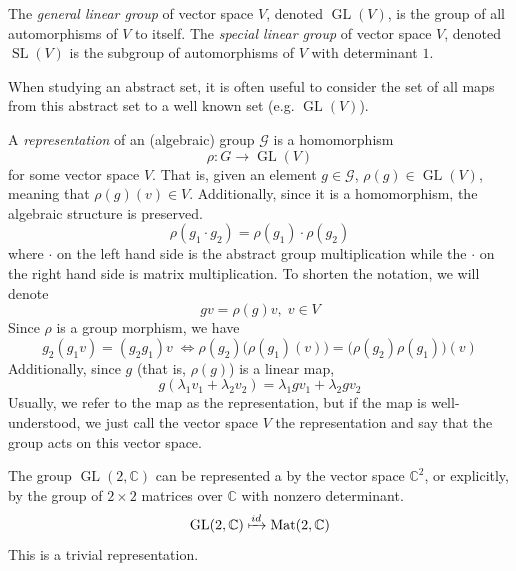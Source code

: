 \documentclass{article}
\DeclareMathOperator{\GL}{GL}
\DeclareMathOperator{\SL}{SL}
\begin{document}
  \begin{definition}
    The \textit{general linear group} of vector space $V$, denoted $\GL(V)$, is the group of all automorphisms of $V$ to itself. The \textit{special linear group} of vector space $V$, denoted $\SL(V)$ is the subgroup of automorphisms of $V$ with determinant $1$. 
  \end{definition}

  When studying an abstract set, it is often useful to consider the set of all maps from this abstract set to a well known set (e.g. $\GL(V)$). 

  \begin{definition}
    A \textit{representation} of an (algebraic) group $\mathcal{G}$ is a homomorphism 
    \begin{equation}
      \rho: G \longrightarrow \GL(V)
    \end{equation}
    for some vector space $V$. That is, given an element $g \in \mathcal{G}$, $\rho(g) \in \GL (V)$, meaning that $\rho(g)(v) \in V$. Additionally, since it is a homomorphism, the algebraic structure is preserved. 
    \begin{equation}
      \rho(g_1 \cdot g_2) = \rho(g_1) \cdot \rho(g_2)
    \end{equation}
    where $\cdot$ on the left hand side is the abstract group multiplication while the $\cdot$ on the right hand side is matrix multiplication. To shorten the notation, we will denote 
    \begin{equation}
      g v = \rho(g) v, \; v \in V
    \end{equation}
    Since $\rho$ is a group morphism, we have 
    \begin{equation}
      g_2 (g_1 v) = (g_2 g_1) v \; \iff \rho(g_2) \big( \rho(g_1) (v) \big) = \big( \rho(g_2) \rho(g_1) \big) (v)
    \end{equation}
    Additionally, since $g$ (that is, $\rho(g)$) is a linear map, 
    \begin{equation}
      g(\lambda_1 v_1 + \lambda_2 v_2) = \lambda_1 g v_1 + \lambda_2 g v_2
    \end{equation}
    Usually, we refer to the map as the representation, but if the map is well-understood, we just call the vector space $V$ the representation and say that the group acts on this vector space. 
  \end{definition}

  \begin{example}
    The group $\GL(2, \mathbb{C})$ can be represented a by the vector space $\mathbb{C}^2$, or explicitly, by the group of $2 \times 2$ matrices over $\mathbb{C}$ with nonzero determinant.
    \begin{equation}
      \GL(2, \mathbb{C}) \xmapsto{id} \text{Mat}(2, \mathbb{C})
    \end{equation}
    This is a trivial representation. 
  \end{example}
\end{document}
